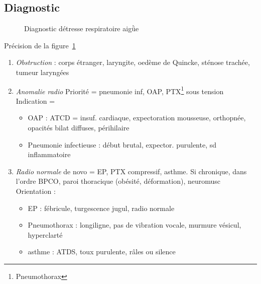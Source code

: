 \documentclass{article}
\begin{document}
\subsection{Diagnostic}

\begin{figure}[htpb]
  \centering
  \caption{Diagnostic détresse respiratoire aigǜe}
  \label{fig:diag_detresse_respi}
\end{figure}

Précision de la figure~\ref{fig:diag_detresse_respi}
\begin{enumerate}
\item \textit{Obstruction}  : corps étranger, laryngite, oedème de Quincke, sténose
  trachée, tumeur laryngées
\item \textit{Anomalie radio} Priorité = pneumonie inf, OAP,
  PTX\footnote{Pneumothorax} sous
  tension\\
  Indication =
  \begin{itemize}
  \item OAP : {ATCD = insuf. cardiaque}, {expectoration mousseuse, orthopnée},
    {opacités bilat diffuses, périhilaire}
  \item Pneumonie infectieuse : {début brutal}, {expector. purulente}, {sd
      inflammatoire}
  \end{itemize}
\item \textit{Radio normale} de novo = EP, PTX compressif, asthme. Si
  chronique, dans l'ordre BPCO, paroi thoracique (obésité, déformation),
  neuromusc\\
  Orientation :
  \begin{itemize}
  \item EP : fébricule, turgescence jugul, radio normale
  \item Pneumothorax : {longiligne}, {pas de vibration vocale}, murmure vésicul,
    {hyperclarté}
  \item asthme : ATDS, toux purulente, râles ou silence
  \end{itemize}
\end{enumerate}
\end{document}
